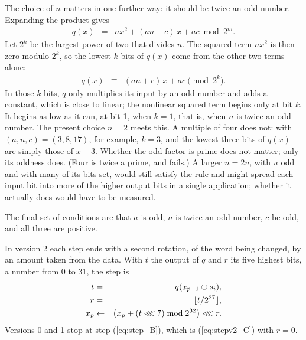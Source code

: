 The choice of $n$ matters in one further way: it should be twice an odd
number. Expanding the product gives
\begin{eqnarray}
q(x) &=& n x^2 + (an+c)\,x + ac \bmod 2^{m}. \label{eq:qparts_A}
\end{eqnarray}
Let $2^k$ be the largest power of two that divides $n$. The squared term
$n x^2$ is then zero modulo $2^k$, so the lowest $k$ bits of $q(x)$ come from the
other two terms alone:
\begin{eqnarray}
q(x) &\equiv& (an+c)\,x + ac \pmod{2^k}. \label{eq:qparts_B}
\end{eqnarray}
In those $k$ bits, $q$ only multiplies its input by an odd number and adds a
constant, which is close to linear; the nonlinear squared term begins only at
bit $k$. It begins as low as it can, at bit 1, when $k = 1$, that is, when $n$
is twice an odd number. The present choice $n = 2$ meets this. A multiple of
four does not: with $(a,n,c) = (3,8,17)$, for example, $k = 3$, and the lowest
three bits of $q(x)$ are simply those of $x + 3$. Whether the odd factor is
prime does not matter; only its oddness does. (Four is twice a prime, and fails.)
A larger $n = 2u$, with $u$ odd and with many of its bits set, would still
satisfy the rule and might spread each input bit into more of the higher output
bits in a single application; whether it actually does would have to be
measured.

The final set of conditions are that 
$a$ is odd,
$n$ is twice an odd number, 
$c$ be odd,
and all three are positive.

In version 2 each step ends with a second rotation, of the word being changed,
by an amount taken from the data. With $t$ the output of $q$ and $r$ its five
highest bits, a number from 0 to 31, the step is
\begin{eqnarray}
t &=& q(x_{p-1} \oplus s_i), \label{eq:stepv2_A} \\
r &=& \lfloor t / 2^{27} \rfloor, \label{eq:stepv2_B} \\
x_p &\leftarrow& \bigl( x_p + (t \lll 7) \bmod 2^{32} \bigr) \lll r.
\label{eq:stepv2_C}
\end{eqnarray}
Versions 0 and 1 stop at step (\ref{eq:step_B}), which is (\ref{eq:stepv2_C})
with $r = 0$.

